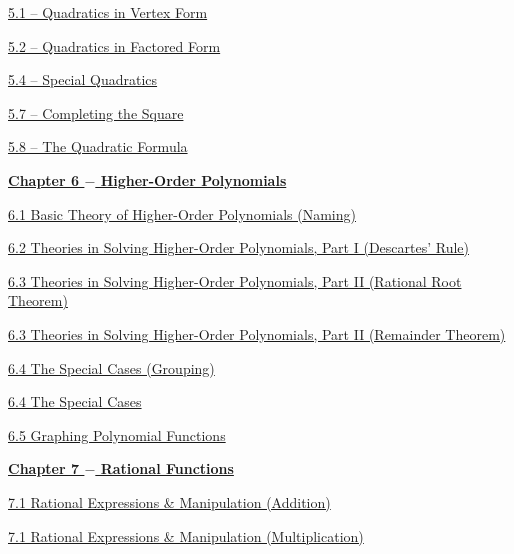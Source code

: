 \documentclass[lang=en,11pt]{elegantbook}
\begin{document}
\href{https://cdn.kutasoftware.com/Worksheets/Alg2/Vertex%20Form%20of%20Parabolas.pdf}{5.1 – Quadratics in Vertex Form}

\href{https://cdn.kutasoftware.com/Worksheets/Alg2/Quadratic%20Equations%20By%20Factoring.pdf}{5.2 – Quadratics in Factored Form}

\href{https://cdn.kutasoftware.com/Worksheets/Alg1/Factoring%20Special%20Cases.pdf}{5.4 – Special Quadratics}

\href{https://cdn.kutasoftware.com/Worksheets/Alg2/Quadratic%20Equations%20By%20Completing%20the%20Square.pdf}{5.7 – Completing the Square}

\href{https://cdn.kutasoftware.com/Worksheets/Alg2/Quadratic%20Formula.pdf}{5.8 – The Quadratic Formula}

\noindent \underline{\textbf{Chapter 6 $-$ Higher-Order Polynomials}}

\href{https://cdn.kutasoftware.com/Worksheets/Alg1/Naming%20Polynomials.pdf}{6.1   Basic Theory of Higher-Order Polynomials (Naming)}

\href{https://cdn.kutasoftware.com/Worksheets/Alg2/Descartes%20Rule%20of%20Signs.pdf}{6.2   Theories in Solving Higher-Order Polynomials, Part I (Descartes' Rule)}

\href{https://cdn.kutasoftware.com/Worksheets/Alg2/Rational%20Root%20Theorem.pdf}{6.3   Theories in Solving Higher-Order Polynomials, Part II (Rational Root Theorem)}

\href{https://cdn.kutasoftware.com/Worksheets/Alg2/The%20Remainder%20Theorem.pdf}{6.3   Theories in Solving Higher-Order Polynomials, Part II (Remainder Theorem)}

\href{https://cdn.kutasoftware.com/Worksheets/Alg1/Factoring%20By%20Grouping.pdf}{6.4   The Special Cases (Grouping)}

\href{https://cdn.kutasoftware.com/Worksheets/Alg1/Factoring%20Special%20Cases.pdf}{6.4   The Special Cases}

\href{https://cdn.kutasoftware.com/Worksheets/Alg2/Graphing%20Polynomial%20Functions.pdf}{6.5  Graphing Polynomial Functions}

\noindent \underline{\textbf{Chapter 7 $-$ Rational Functions}}

\href{https://cdn.kutasoftware.com/Worksheets/Alg1/Adding%20and%20Subtracting%20Rational%20Expressions.pdf}{7.1   Rational Expressions \& Manipulation (Addition)}

\href{https://cdn.kutasoftware.com/Worksheets/Alg1/Multiplying%20Rational%20Expressions.pdf}{7.1   Rational Expressions \& Manipulation (Multiplication)}
\end{document}

